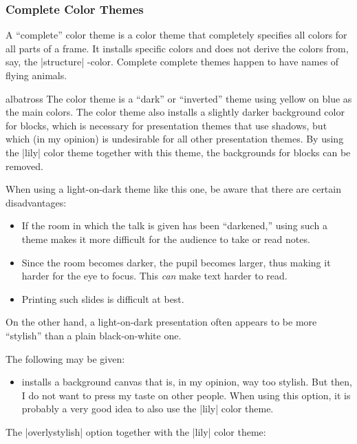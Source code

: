 \subsubsection{Complete Color Themes}

A ``complete'' color theme is a color theme that completely specifies
all colors for all parts of a frame. It installs specific colors and
does not derive the colors from, say, the |structure| \beamer-color.
Complete complete themes happen to have names of flying animals.

\begin{colorthemeexample}{albatross}
  The color theme is a ``dark'' or ``inverted'' theme using yellow on
  blue as the main colors. The color theme also installs a slightly
  darker background color for blocks, which is necessary for
  presentation themes that use shadows, but which (in my opinion) is
  undesirable for all other presentation themes. By using the |lily|
  color theme together with this theme, the backgrounds for blocks can
  be removed.

  When using a light-on-dark theme like this one, be aware that there
  are certain disadvantages:
  \begin{itemize}
  \item
    If the room in which the talk is given has been ``darkened,''
    using such a theme makes it more difficult for the audience to
    take or read notes.
  \item
    Since the room becomes darker, the pupil becomes larger, thus
    making it harder for the eye to focus. This \emph{can} make text
    harder to  read.
  \item
    Printing such slides is difficult at best.
  \end{itemize}

  On the other hand, a light-on-dark presentation often appears to be
  more ``stylish''  than a plain black-on-white one.

  The following  may be given:
  \begin{itemize}
  \item {} installs a background canvas that
    is, in my opinion, way too stylish. But then, I do not want
    to press my taste on other people. When using this option, it is
    probably a very good idea to also use the |lily| color theme.      
  \end{itemize}

  \example The |overlystylish| option together with the |lily| color theme:
\end{colorthemeexample}


